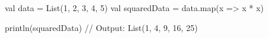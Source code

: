 val data = List(1, 2, 3, 4, 5)
val squaredData = data.map(x => x * x)

println(squaredData) // Output: List(1, 4, 9, 16, 25)